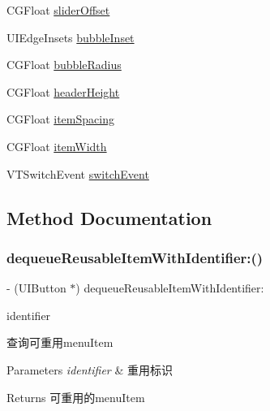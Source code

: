 \begin{DoxyCompactItemize}
\item 
C\+G\+Float \mbox{\hyperlink{interface_v_t_magic_view_ac320dd29b0a56fb4babab1a49497e832}{slider\+Offset}}
\item 
U\+I\+Edge\+Insets \mbox{\hyperlink{interface_v_t_magic_view_af0c144a1236c024e17b1db41c5577aa3}{bubble\+Inset}}
\item 
C\+G\+Float \mbox{\hyperlink{interface_v_t_magic_view_a29c875eccb2c9f9f590a288f9b3be23f}{bubble\+Radius}}
\item 
C\+G\+Float \mbox{\hyperlink{interface_v_t_magic_view_afe5a0c533120b3a248f5caf4de41130f}{header\+Height}}
\item 
C\+G\+Float \mbox{\hyperlink{interface_v_t_magic_view_ad54f1c445d6724bd539b038637873826}{item\+Spacing}}
\item 
C\+G\+Float \mbox{\hyperlink{interface_v_t_magic_view_a6a0fefc7f47e3efae7ac217d94c09013}{item\+Width}}
\item 
V\+T\+Switch\+Event \mbox{\hyperlink{interface_v_t_magic_view_aa87665696c5b4a90a7eb7401185bc319}{switch\+Event}}
\end{DoxyCompactItemize}


\subsection{Method Documentation}
\mbox{\label{interface_v_t_magic_view_acf5bd2bc5f86d5ee19f77abb4f5fe41d}} 
\subsubsection{\texorpdfstring{dequeue\+Reusable\+Item\+With\+Identifier\+:()}{dequeueReusableItemWithIdentifier:()}\hspace{0.1cm}{\footnotesize\ttfamily [1/3]}}
{\footnotesize\ttfamily -\/ (U\+I\+Button $\ast$) dequeue\+Reusable\+Item\+With\+Identifier\+: \begin{DoxyParamCaption}\item[{(N\+S\+String $\ast$)}]{identifier }\end{DoxyParamCaption}}

查询可重用menu\+Item


\begin{DoxyParams}{Parameters}
{\em identifier} & 重用标识\\
\hline
\end{DoxyParams}
\begin{DoxyReturn}{Returns}
可重用的menu\+Item 
\end{DoxyReturn}
\mbox{\label{interface_v_t_magic_view_a53dd4f1868c19fcc9a8fcce1cefb41f8}} 
